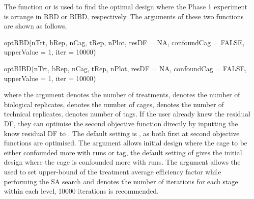 \documentclass[article]{jss}
\begin{document}
The  function  or  is used to find the optimal design where the Phase 1 experiment is arrange in RBD or BIBD, respectively.  The arguments of these two functions are shown as follows, 
\begin{CodeChunk}
\begin{CodeInput}
optRBD(nTrt, bRep, nCag, tRep, nPlot, resDF = NA, confoundCag = FALSE, 
upperValue = 1,  iter = 10000)

optBIBD(nTrt, bRep, nCag, tRep, nPlot, resDF = NA, confoundCag = FALSE, 
upperValue = 1,  iter = 10000)
\end{CodeInput}
\end{CodeChunk}
where the argument  denotes the number of treatments,  denotes the number of biological replicates,  denotes the number of cages,  denotes the number of technical replicates,  denotes number of tags. If the user already knew the residual DF, they can optimise the second objective function directly by inputting the know residual DF to . The default setting is , as both first at second objective functions are optimised. The argument  allows initial design where the cage to be either confounded more with runs or tag, the default setting of  gives the initial design where the cage is confounded more with runs. The argument  allows the used to set upper-bound of the treatment average efficiency factor while performing the SA search and  denotes the number of iterations for each stage within each level, 10000 iterations is recommended.



\end{document}
